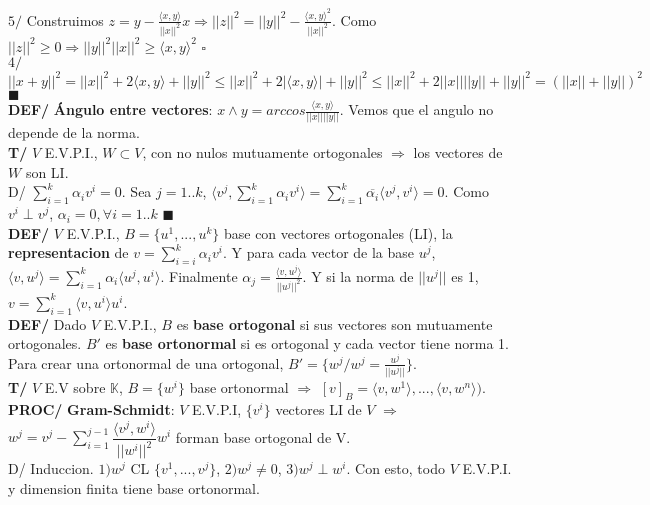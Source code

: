 \documentclass[10pt,a4paper]{article}
\newcommand*{\QEDA}{\null\nobreak\hfill\ensuremath{\blacksquare}}
\newcommand*{\QEDB}{\null\nobreak\hfill\ensuremath{\square}}
\begin{document}
\vspace{-1pc}
$5/$ Construimos $z=y-\frac{\langle x,y \rangle}{||x||^2}x \Rightarrow ||z||^2 = ||y||^2-\frac{\langle x,y \rangle^2}{||x||^2}$. Como $||z||^2 \geq 0 \Rightarrow ||y||^2||x||^2 \geq \langle x,y \rangle^2$ \QEDB\\
$4/$ $||x+y||^2 = ||x||^2+2 \langle x,y \rangle + ||y||^2 \leq ||x||^2+2 |\langle x,y \rangle| + ||y||^2 \leq ||x||^2 + 2||x||||y|| + ||y||^2 = (||x||+||y||)^2$ \QEDA\\
\textbf{DEF/} \textbf{\'Angulo entre vectores}: $x \wedge y = arccos \frac{\langle x,y \rangle}{||x||||y||}$. Vemos que el angulo no depende de la norma.\\
\textbf{T/} $V$ E.V.P.I., $W \subset V$, con no nulos mutuamente ortogonales $\Rightarrow$ los vectores de $W$ son LI.\\
D/ $\sum_{i=1}^k \alpha_i v^i = 0$. Sea $j=1..k$, $\langle v^j, \sum_{i=1}^k \alpha_i v^i \rangle = \sum_{i=1}^k \overline{\alpha_i} \langle v^j, v^i \rangle = 0$. Como $v^i \perp v^j$, $\alpha_i = 0, \forall i = 1..k$ \QEDA\\
\textbf{DEF/} $V$ E.V.P.I., $B=\{u^1,...,u^k\}$ base con vectores ortogonales (LI), la \textbf{representacion} de $v=\sum_{i=i}^k \alpha_i v^i$. Y para cada vector de la base $u^j$, $\langle v,u^j \rangle = \sum_{i=1}^k \alpha_i \langle u^j, u^i \rangle$. Finalmente $\alpha_j = \frac{\langle v,u^j\rangle}{||u^j||^2}$. Y si la norma de $||u^j||$ es 1, $v = \sum_{i=1}^k \langle v, u^i \rangle u^i$.\\
\textbf{DEF/} Dado $V$ E.V.P.I., $B$ es \textbf{base ortogonal} si sus vectores son mutuamente ortogonales. $B'$ es \textbf{base ortonormal} si es ortogonal y cada vector tiene norma 1. Para crear una ortonormal de una ortogonal, $B' = \{w^j / w^j = \frac{u^j}{||u^j||}\}$.\\
\textbf{T/} $V$ E.V sobre $\mathbb{K}$, $B=\{w^i\}$ base ortonormal $\Rightarrow$ $[v]_B = \langle v,w^1 \rangle, ..., \langle v,w^n \rangle)$.\\
\textbf{PROC/} \textbf{Gram-Schmidt}: $V$ E.V.P.I, $\{v^i\}$ vectores LI de $V$ $\Rightarrow$ $w^j = v^j - \sum_{i=1}^{j-1} \dfrac{\langle v^j,w^i \rangle}{||w^i||^2} w^i$ forman base ortogonal de V.\\
D/ Induccion. $1) w^j$ CL $\{v^1,...,v^j\}$, $2) w^j \not = 0$, $3) w^j \perp w^i$. Con esto, todo $V$ E.V.P.I. y dimension finita tiene base ortonormal.
\end{document}
